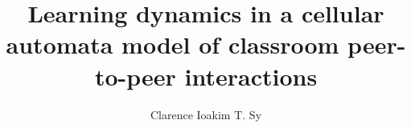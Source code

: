 \documentclass[bs]{nip3} %
\title{Learning dynamics in a cellular automata model of classroom peer-to-peer interactions} %
\author{Clarence Ioakim T. Sy} %
\begin{document}
\maketitle %
\makePrelim %





\appendix



\end{document}
